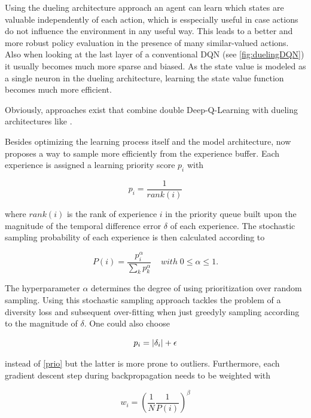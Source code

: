 Using the dueling architecture approach an agent can learn which states are valuable independently of each action, which is esspecially useful in case actions do not influence the environment in any useful way. This leads to a better and more robust policy evaluation in the presence of many similar-valued actions. Also when looking at the last layer of a conventional DQN (see \autoref{fig:duelingDQN}) it usually becomes much more sparse and biased. As the state value is modeled as a single neuron in the dueling architecture, learning the state value function becomes much more efficient. 

Obviously, approaches exist that combine double Deep-Q-Learning with dueling architectures like \cite{Huang2018}. 

Besides optimizing the learning process itself and the model architecture, \cite{Schaul2016} now proposes a way to sample more efficiently from the experience buffer. Each experience is assigned a learning priority score $p_i$ with 

\begin{equation} \label{prio}
	p_i = \frac{1}{rank(i)}
\end{equation}

where $rank(i)$ is the rank of experience $i$ in the priority queue built upon the magnitude of the temporal difference error $\delta$ of each experience. The stochastic sampling probability of each experience is then calculated according to 

\begin{equation} \label{prob}
	P(i) = \frac{p_i^{\alpha}}{\sum_k p_k^{\alpha}} \;\;\;\; with \; 0\le\alpha\le1.
\end{equation}

The hyperparameter $\alpha$ determines the degree of using prioritization over random sampling. Using this stochastic sampling approach tackles the problem of a diversity loss and subsequent over-fitting when just greedyly sampling according to the magnitude of $\delta$. One could also choose 

\begin{equation} \label{prio2}
	p_i = \lvert\delta_i\rvert + \epsilon
\end{equation}

instead of \ref{prio} but the latter is more prone to outliers. Furthermore, each gradient descent step during backpropagation needs to be weighted with 

\begin{equation} \label{weight}
	w_i = ( \frac{1}{N} \frac{1}{P(i)} )^\beta
\end{equation}

